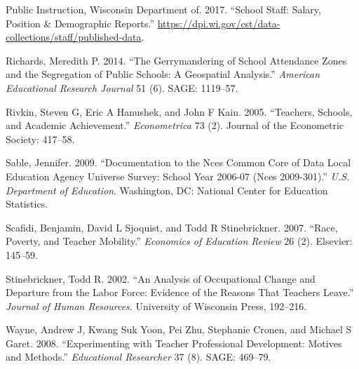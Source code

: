 \documentclass[]{article}
\begin{document}
\hypertarget{ref-dpi}{}
Public Instruction, Wisconsin Department of. 2017. ``School Staff:
Salary, Position \& Demographic Reports.''
\url{https://dpi.wi.gov/cst/data-collections/staff/published-data}.

\hypertarget{ref-richards}{}
Richards, Meredith P. 2014. ``The Gerrymandering of School Attendance
Zones and the Segregation of Public Schools: A Geospatial Analysis.''
\emph{American Educational Research Journal} 51 (6). SAGE: 1119--57.

\hypertarget{ref-rivkin}{}
Rivkin, Steven G, Eric A Hanushek, and John F Kain. 2005. ``Teachers,
Schools, and Academic Achievement.'' \emph{Econometrica} 73 (2). Journal
of the Econometric Society: 417--58.

\hypertarget{ref-sable}{}
Sable, Jennifer. 2009. ``Documentation to the Nces Common Core of Data
Local Education Agency Universe Survey: School Year 2006-07 (Nces
2009-301).'' \emph{U.S. Department of Education}. Washington, DC:
National Center for Education Statistics.

\hypertarget{ref-scafidi}{}
Scafidi, Benjamin, David L Sjoquist, and Todd R Stinebrickner. 2007.
``Race, Poverty, and Teacher Mobility.'' \emph{Economics of Education
Review} 26 (2). Elsevier: 145--59.

\hypertarget{ref-stinebrickner}{}
Stinebrickner, Todd R. 2002. ``An Analysis of Occupational Change and
Departure from the Labor Force: Evidence of the Reasons That Teachers
Leave.'' \emph{Journal of Human Resources}. University of Wisconsin
Press, 192--216.

\hypertarget{ref-wayne}{}
Wayne, Andrew J, Kwang Suk Yoon, Pei Zhu, Stephanie Cronen, and Michael
S Garet. 2008. ``Experimenting with Teacher Professional Development:
Motives and Methods.'' \emph{Educational Researcher} 37 (8). SAGE:
469--79.
\end{document}
